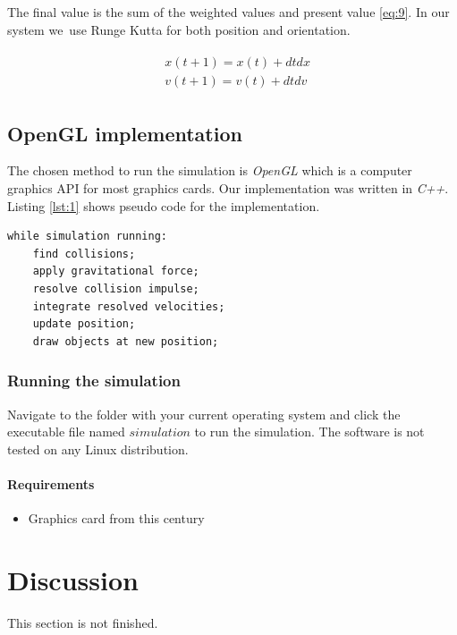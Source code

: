 \documentclass[a4paper,12pt]{report}
\begin{document}
The final value is the sum of the weighted values and present value \ref{eq:9}. In our system we use Runge Kutta for both position and orientation.

\begin{equation}
\begin{split}
\begin{aligned}
& x(t+1)=x(t)+dtdx\\
& v(t+1)=v(t)+dtdv
\end{aligned}
\end{split}
\label{eq:9}
\end{equation}

\section{OpenGL implementation}

The chosen method to run the simulation is \emph{OpenGL} which is a computer graphics API for most graphics cards. Our implementation was written in \emph{C++}. Listing \ref{lst:1} shows pseudo code for the implementation.

\begin{lstlisting}[caption={Pseudo code for the simulation loop.}, label=lst:1]
while simulation running:
    find collisions;
    apply gravitational force;
    resolve collision impulse;
    integrate resolved velocities;
    update position;
    draw objects at new position;
\end{lstlisting}

\subsection{Running the simulation}
Navigate to the folder with your current operating system and click the executable file named $simulation$ to run the simulation. The software is not tested on any Linux distribution.

\subsubsection{Requirements}
\begin{itemize}
    \item Graphics card from this century
\end{itemize}


\chapter{Discussion}

This section is not finished.






\end{document}
